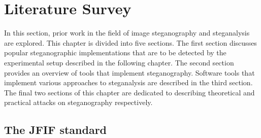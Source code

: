 \chapter{Literature Survey}
\label{ch:litsurvey}
In this section, prior work in the field of image steganography and steganalysis are explored. This chapter is divided into five sections. The first section discusses popular steganographic implementations that are to be detected by the experimental setup described in the following chapter. The second section provides an overview of tools that implement steganography. Software tools that implement various approaches to steganalysis are described in the third section. The final two sections of this chapter are dedicated to describing theoretical and practical attacks on steganography respectively.
\section{The JFIF standard}
\label{sec:jpeg}


